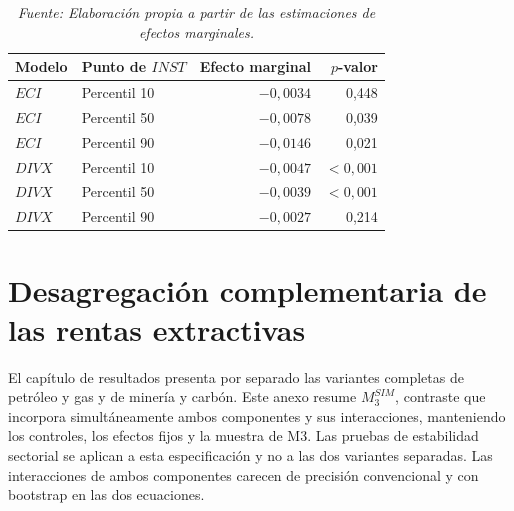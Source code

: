 \documentclass[../../TFM.tex]{subfiles}
\begin{document}
	\begin{table}[htbp]
		\centering
		\small
		\caption{Efecto marginal de $RENTS$ dentro del soporte de $INST$}
		\label{tab:anexo_efectos_marginales_peer2}
		\begin{tabular}{llrr}
			\toprule
			Modelo & Punto de $INST$ & Efecto marginal & $p$-valor \\
			\midrule
			$ECI$ & Percentil 10 & $-0,0034$ & 0,448 \\
			$ECI$ & Percentil 50 & $-0,0078$ & 0,039 \\
			$ECI$ & Percentil 90 & $-0,0146$ & 0,021 \\
			\addlinespace
			$DIVX$ & Percentil 10 & $-0,0047$ & $<0,001$ \\
			$DIVX$ & Percentil 50 & $-0,0039$ & $<0,001$ \\
			$DIVX$ & Percentil 90 & $-0,0027$ & 0,214 \\
			\bottomrule
		\end{tabular}
		\caption*{\footnotesize \textit{Nota:} Los efectos se calculan en cinco puntos entre los percentiles 10 y 90; se reportan tres puntos representativos. Las pendientes no son significativas en todo el soporte y siguen patrones opuestos entre ecuaciones, por lo que no respaldan una moderación institucional general.}
		\caption*{\footnotesize \textit{Fuente: Elaboración propia a partir de las estimaciones de efectos marginales.}}
	\end{table}

	\section{Desagregación complementaria de las rentas extractivas}
	\label{sec:anexo_desagregacion_peer2}

	El capítulo de resultados presenta por separado las variantes completas de
	petróleo y gas y de minería y carbón. Este anexo resume $M_{3}^{SIM}$, contraste
	que incorpora simultáneamente ambos componentes y sus interacciones, manteniendo
	los controles, los efectos fijos y la muestra de M3. Las pruebas de estabilidad
	sectorial se aplican a esta especificación y no a las dos variantes separadas.
	Las interacciones de ambos componentes carecen de precisión convencional y con
	bootstrap en las dos ecuaciones.
\end{document}
